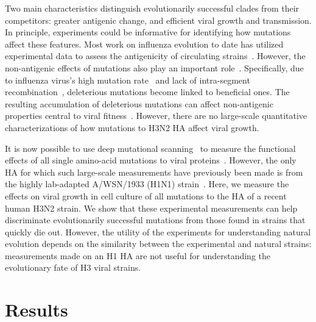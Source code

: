 \documentclass[9pt,twocolumn,twoside]{pnas-new-for-biorxiv}
\begin{document}
Two main characteristics distinguish evolutionarily successful clades from their competitors: greater antigenic change, and efficient viral growth and transmission.
In principle, experiments could be informative for identifying how mutations affect these features.
Most work on influenza evolution to date has utilized experimental data to assess the antigenicity of circulating strains~\cite{sun2013using,harvey2016identification,neher2016prediction,koel2013substitutions,chambers2015identification,li2016selection}.
However, the non-antigenic effects of mutations also play an important role~\cite{pybus2007phylogenetic,strelkowa2012clonal,luksza2014predictive,koelle2015effects}.
Specifically, due to influenza virus's high mutation rate~\cite{holland1982rapid,steinhauer1987rapid,lauring2010quasispecies} and lack of intra-segment recombination~\cite{boni2008homologous}, deleterious mutations become linked to beneficial ones.
The resulting accumulation of deleterious mutations can affect non-antigenic properties central to viral fitness~\cite{luksza2014predictive}.
However, there are no large-scale quantitative characterizations of how mutations to H3N2 HA affect viral growth.

It is now possible to use deep mutational scanning~\cite{fowler2014deep} to measure the functional effects of all single amino-acid mutations to viral proteins~\cite{thyagarajan2014inherent,wu2014high,doud2016accurate,haddox2016experimental,qi2015high,haddox2018mapping}.
However, the only HA for which such large-scale measurements have previously been made is from the highly lab-adapted A/WSN/1933 (H1N1) strain~\cite{thyagarajan2014inherent,wu2014high,doud2016accurate}.
Here, we measure the effects on viral growth in cell culture of all mutations to the HA of a recent human H3N2 strain.
We show that these experimental measurements can help discriminate evolutionarily successful mutations from those found in strains that quickly die out.
However, the utility of the experiments for understanding natural evolution depends on the similarity between the experimental and natural strains: measurements made on an H1 HA are not useful for understanding the evolutionary fate of H3 viral strains.

\section*{Results}
\label{sec:results}
\end{document}
